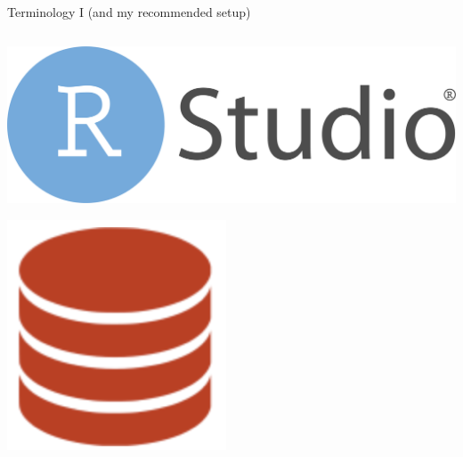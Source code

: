 \documentclass[ignorenonframetext, 10pt, aspectratio=169]{beamer}
\begin{document}
\begin{frame}{Terminology I (and my recommended setup)}
\begin{columns}[T]
\begin{column}{0.4\textwidth}
\bigskip
{}\includegraphics[width = 0.6\linewidth]{RStudio-Logo-Flat.png}

\bigskip
\bigskip
{}\includegraphics[width = 0.25\linewidth]{repo-0.png}
\end{column}
\end{columns}
\end{frame}
\end{document}
